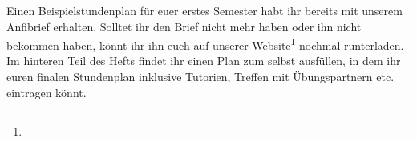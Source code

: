 Einen Beispielstundenplan für euer erstes Semester habt ihr bereits mit unserem Anfibrief erhalten. Solltet ihr den Brief nicht mehr haben oder ihn nicht bekommen haben, könnt ihr ihn euch auf unserer Website\footnote{} nochmal runterladen.\\
Im hinteren Teil des Hefts findet ihr einen Plan zum selbst ausfüllen, in dem ihr euren finalen Stundenplan inklusive Tutorien, Treffen mit Übungspartnern etc. eintragen könnt.

